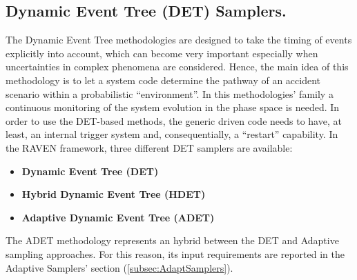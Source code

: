 \subsection{Dynamic Event Tree (DET) Samplers.}
\label{subsec:DETSamplers}
The Dynamic Event Tree methodologies are designed to take the timing of events explicitly into account, which can become very important especially when uncertainties in complex phenomena are considered. Hence, the main idea of this methodology is to let a system code determine the pathway of an accident scenario within a probabilistic ``environment''.
In this methodologies' family a continuous monitoring of the system evolution in the phase space is needed.  In order to use the DET-based methods, the generic driven  code needs to have, at least, an internal trigger system and, consequentially, a ``restart'' capability.
In the RAVEN framework, three different  DET samplers are available:
\begin{itemize}
\item \textbf{Dynamic Event Tree (DET)}
\item \textbf{Hybrid Dynamic Event Tree (HDET)}
\item \textbf{Adaptive Dynamic Event Tree (ADET)}
\end{itemize}
The ADET methodology represents an hybrid between the DET and Adaptive sampling approaches. For this reason, its input requirements are reported in the Adaptive Samplers' section (\ref{subsec:AdaptSamplers}).


